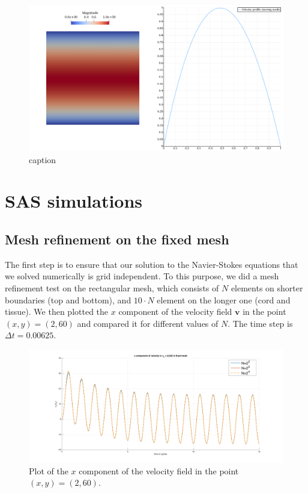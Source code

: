 \documentclass[a4paper,11pt,openright,twoside]{book}
\begin{document}
\begin{figure}[h!]
\centering
\includegraphics[width=\textwidth]{images/velocity_moving.png}
\caption{caption}
\end{figure}

\chapter{SAS simulations}

\section{Mesh refinement on the fixed mesh}
The first step is to ensure that our solution to the Navier-Stokes equations that we solved numerically is grid independent. To this purpose, we did a mesh refinement test on the rectangular mesh, which consists of $N$ elements on shorter boundaries (top and bottom), and $10 \cdot N$ element on the longer one (cord and tissue). We then plotted the $x$ component of the velocity field $\mathbf{v}$ in the point $(x,y) = (2, 60)$ and compared it for different values of $N$. The time step is $\Delta t = 0.00625$. 

\begin{figure}[h!]

\centering
\includegraphics[width=\textwidth]{images/mesh_refinement}
\caption{Plot of the $x$ component of the velocity field in the point $(x,y)=(2,60)$.}
\label{img:sas:1}
\end{figure}
\end{document}
